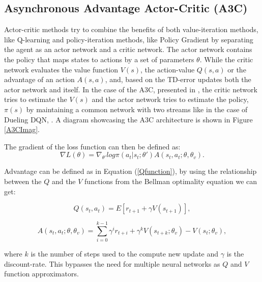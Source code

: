 \subsection{Asynchronous Advantage Actor-Critic (A3C)}\label{A3C}
\noindent Actor-critic methods try to combine the benefits of both value-iteration methods, like Q-learning and policy-iteration methods, like Policy Gradient by separating the agent as an actor network and a critic network. The actor network contains the policy that maps states to actions by a set of parameters $\theta$. While the critic network evaluates the value function $V(s)$, the action-value $Q(s,a)$ or the advantage of an action $A(s,a)$, and, based on the \acrshort{TD}-error updates both the actor network and itself. In the case of the \acrshort{A3C}, presented in \cite{a3c}, the critic network tries to estimate the $V(s)$ and the actor network tries to estimate the policy, $\pi(s)$ by maintaining a common network with two streams like in the case of \acrshort{Dueling DQN}, \cite{duelingDQN}. A diagram showcasing the A3C architecture is shown in Figure \ref{A3CImag}.

The gradient of the loss function can then be defined as:
\begin{equation}
    \nabla L(\theta) = \nabla_{\theta'} log\pi(a_t|s_t; \theta')A(s_t, a_t; \theta, \theta_v) .
\end{equation}

Advantage can be defined as in Equation (\ref{Qfunction}), by using the relationship between the $Q$ and the $V$ functions from the Bellman optimality equation we can get:

\begin{equation}
    Q(s_t, a_t) = E[r_{t+1} + \gamma V(s_{t+1})] ,
\end{equation}

\begin{equation}
    A(s_t, a_t; \theta, \theta_v) = \sum\limits_{i=0}^{k-1} \gamma^i r_{t+i} + \gamma^k V(s_{t+k}; \theta_v) - V(s_t;\theta_v),
\end{equation}

where $k$ is the number of steps used to the compute new update and $\gamma$ is the discount-rate. This bypasses the need for multiple neural networks as $Q$ and $V$ function approximators.

